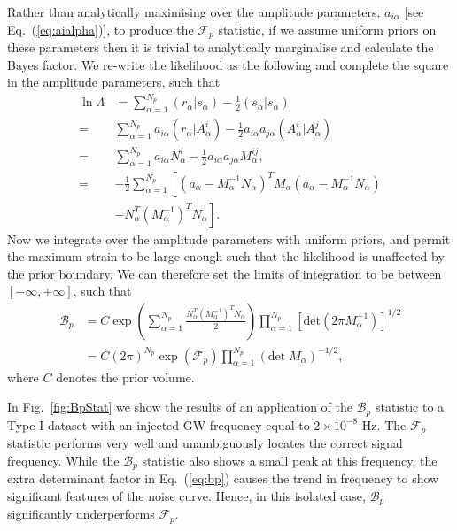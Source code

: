 \documentclass[prd,twocolumn,showpacs,nofootinbib]{revtex4}
\begin{document}
Rather than analytically maximising over the amplitude parameters, $a_{i\alpha}$ [see Eq.\ (\ref{eq:aialpha})], to produce the $\mathcal{F}_p$ statistic, if we assume uniform priors on these parameters then it is trivial to analytically marginalise and calculate the Bayes factor. We re-write the likelihood as the following and complete the square in the amplitude parameters, such that
\begin{align}
\ln\Lambda &= \sum_{\alpha=1}^{N_p} (r_{\alpha}|s_{\alpha}) - \frac{1}{2}(s_{\alpha}|s_{\alpha}) \nonumber\\
=& \sum_{\alpha=1}^{N_p} a_{i\alpha}(r_{\alpha}|A^i_{\alpha}) - \frac{1}{2}a_{i\alpha}a_{j\alpha}(A^i_{\alpha}|A^j_{\alpha}) \nonumber\\
=& \sum_{\alpha=1}^{N_p} a_{i\alpha}N^i_{\alpha} - \frac{1}{2}a_{i\alpha}a_{j\alpha}M^{ij}_{\alpha}, \nonumber\\
=& -\frac{1}{2}\sum_{\alpha=1}^{N_p}\left[\left(a_{\alpha}-M_{\alpha}^{-1}N_{\alpha}\right)^T M_{\alpha}\left(a_{\alpha}-M_{\alpha}^{-1}N_{\alpha}\right)\right. \nonumber\\
&\left. - N_{\alpha}^T \left(M_{\alpha}^{-1}\right)^T N_{\alpha}\right].
\end{align}
Now we integrate over the amplitude parameters with uniform priors, and permit the maximum strain to be large enough such that the likelihood is unaffected by the prior boundary. We can therefore set the limits of integration to be between $[-\infty,+\infty]$, such that %
\begin{align}\label{eq:bp}
\mathcal{B}_p &= C\exp\left(\sum_{\alpha=1}^{N_p}\frac{N_{\alpha}^T \left(M_{\alpha}^{-1}\right)^T N_{\alpha}}{2}\right)\prod_{\alpha=1}^{N_p}\left[\text{det}\left(2\pi M_{\alpha}^{-1}\right)\right]^{1/2} \nonumber\\
&= C\left(2\pi\right)^{N_p}\exp\left(\mathcal{F}_p\right) \prod_{\alpha=1}^{N_p} \left(\text{det}\;M_{\alpha}\right)^{-1/2},
\end{align}
where $C$ denotes the prior volume. 

In Fig.\ \ref{fig:BpStat} we show the results of an application of the $\mathcal{B}_p$ statistic to a Type I dataset with an injected GW frequency equal to $2\times 10^{-8}$ Hz. The $\mathcal{F}_p$ statistic performs very well and unambiguously locates the correct signal frequency. While the $\mathcal{B}_p$ statistic also shows a small peak at this frequency, the extra determinant factor in Eq.\ (\ref{eq:bp}) causes the trend in frequency to show significant features of the noise curve. Hence, in this isolated case, $\mathcal{B}_p$ significantly underperforms $\mathcal{F}_p$. 
\end{document}
